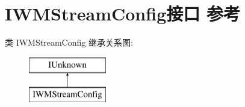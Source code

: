 \hypertarget{interface_i_w_m_stream_config}{}\section{I\+W\+M\+Stream\+Config接口 参考}
\label{interface_i_w_m_stream_config}
类 I\+W\+M\+Stream\+Config 继承关系图\+:\begin{figure}[H]
\begin{center}
\leavevmode
\includegraphics[height=2.000000cm]{interface_i_w_m_stream_config}
\end{center}
\end{figure}
